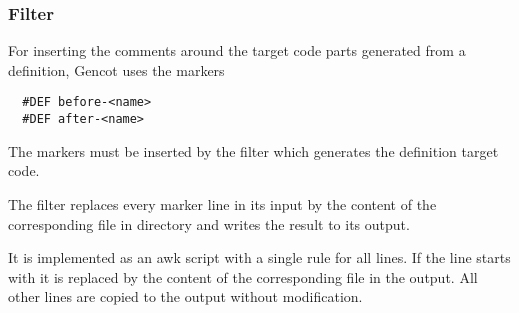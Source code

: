 \subsubsection{Filter }

For inserting the comments around the target code parts generated from a definition, Gencot uses the markers
\begin{verbatim}
  #DEF before-<name>
  #DEF after-<name>
\end{verbatim}
The markers must be inserted by the filter which generates the definition target code.

The filter  replaces every marker line in its input by the content of the corresponding
 file in directory  and writes the result to its output.

It is implemented as an awk script with a single rule for all lines. If the line starts with  it is
replaced by the content of the corresponding file in the output. All other lines are copied to the output without 
modification.

 

